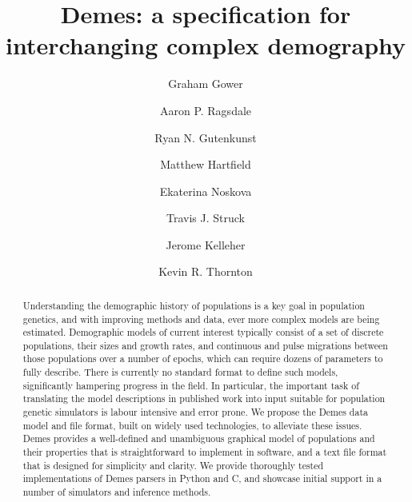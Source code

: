 \documentclass[11pt]{article}
\begin{document}
\title{Demes: a specification for interchanging complex demography}
\author[1,$\star$]{Graham Gower}
\author[2,$\star$]{Aaron P. Ragsdale}

\author[3]{Ryan N. Gutenkunst}
\author[4]{Matthew Hartfield}
\author[5]{Ekaterina Noskova}
\author[3]{Travis J. Struck}
\author[6,$\dagger$,$\aleph$]{Jerome Kelleher}
\author[7,$\dagger$]{Kevin R. Thornton}




\maketitle

\begin{abstract}
Understanding the demographic history of populations is a
key goal in population genetics, and with improving methods
and data, ever more complex models are being estimated.
Demographic models of current interest
typically consist of a set of discrete populations,
their sizes and growth rates, and continuous and pulse migrations
between those populations over a number of epochs, which can require
dozens of parameters to fully describe. There is currently
no standard format to define such models, significantly
hampering  progress in the field. In particular, the important
task of translating the model descriptions in published
work into input suitable for population genetic simulators is labour intensive
and error prone.
We propose the Demes data model and file format,
built on widely used technologies,
to alleviate these issues. Demes provides a well-defined and unambiguous
graphical model of populations and their properties that is straightforward to
implement in software, and a text file format that is designed for
simplicity and clarity.
We provide thoroughly tested implementations of Demes parsers in Python
and C, and showcase initial support in a number of simulators and inference
methods.
\end{abstract}
\end{document}

